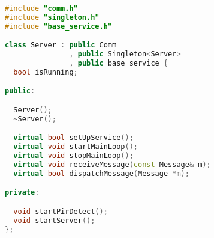 \begin{lstlisting}[caption=server.h,language=C++]
#include "comm.h"
#include "singleton.h"
#include "base_service.h"

class Server : public Comm
               , public Singleton<Server>
               , public base_service {
  bool isRunning;

public:

  Server();
  ~Server();

  virtual bool setUpService();
  virtual void startMainLoop();
  virtual void stopMainLoop();
  virtual void receiveMessage(const Message& m);
  virtual bool dispatchMessage(Message *m);

private:

  void startPirDetect();
  void startServer();
};

\end{lstlisting}






